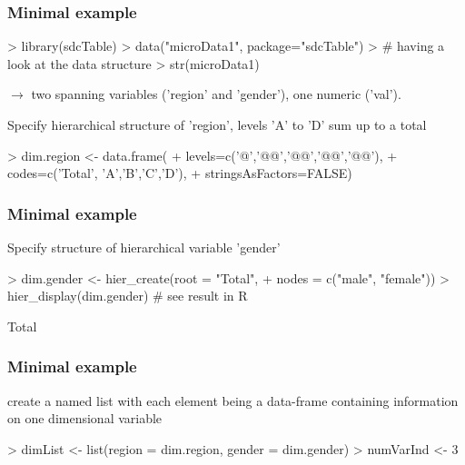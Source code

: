 \documentclass[pdfpagelabels=false, usepdftitle=false]{beamer}
\begin{document}
\begin{frame}[fragile]\frametitle{Minimal example}

\begin{Schunk}
\begin{Sinput}
> library(sdcTable)
> data("microData1", package="sdcTable")
> # having a look at the data structure
> str(microData1)
\end{Sinput}
\end{Schunk}

$\rightarrow$ two spanning variables ('region' and 'gender'), one
numeric ('val').

Specify hierarchical structure of 'region', levels 'A' to 'D' sum up to a total
\begin{Schunk}
\begin{Sinput}
> dim.region <- data.frame(
+  levels=c('@','@@','@@','@@','@@'),
+  codes=c('Total', 'A','B','C','D'),
+  stringsAsFactors=FALSE)
\end{Sinput}
\end{Schunk}
\end{frame}

\begin{frame}[fragile]\frametitle{Minimal example}

Specify structure of hierarchical variable 'gender'


\begin{Schunk}
\begin{Sinput}
> dim.gender <- hier_create(root = "Total", 
+                 nodes = c("male", "female"))
> hier_display(dim.gender) # see result in R
\end{Sinput}
\begin{Soutput}
Total

\end{Soutput}
\end{Schunk}

\end{frame}

\begin{frame}[fragile]\frametitle{Minimal example}

create a named list with each element being a data-frame
 containing information on one dimensional variable 
 
\begin{Schunk}
\begin{Sinput}
> dimList <- list(region = dim.region, gender = dim.gender)
> numVarInd <- 3
\end{Sinput}
\end{Schunk}

\end{frame}
\end{document}
